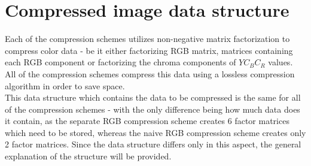 \documentclass[thesis=M,english]{FITthesis}[2012/10/20]
\begin{document}
\section{Compressed image data structure}
\label{sec:data-structure}
Each of the compression schemes utilizes non-negative matrix factorization
to compress color data - be it either factorizing RGB matrix, matrices containing
each RGB component or factorizing the chroma components of $YC_BC_R$ values.
All of the compression schemes compress this data using a lossless compression
algorithm in order to save space.
\\

This data structure which contains the data to be compressed is the same for all
of the compression schemes - with the only difference being how much data does
it contain, as the separate RGB compression scheme creates 6 factor matrices which
need to be stored, whereas the naive RGB compression scheme creates only 2
factor matrices. Since the data structure differs only in this aspect, the general
explanation of the structure will be provided.
\\
\end{document}
